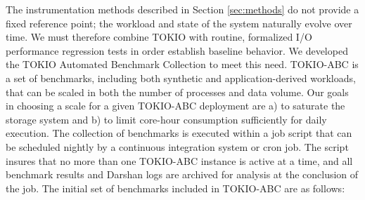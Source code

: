 The instrumentation methods described in Section \ref{sec:methods}
do not provide a fixed reference point; the workload and state of the
system naturally evolve over time.  We must therefore combine TOKIO with
routine, formalized I/O performance regression tests in order establish baseline behavior.
%
We developed the TOKIO Automated Benchmark Collection to meet
this need.
TOKIO-ABC is a set of benchmarks, including
both synthetic and application-derived workloads, that can be scaled in
both the number of processes and data volume.
Our goals in choosing a scale for a given TOKIO-ABC deployment are
a) to saturate the storage system and
b) to limit core-hour consumption sufficiently for daily execution.
The collection of benchmarks is
executed within a job script that can be scheduled nightly by a continuous
integration system or cron job.  The script insures that no more than
one TOKIO-ABC instance is active at a time, and all benchmark results
and Darshan logs are archived for analysis at the conclusion of the job.
The initial set of benchmarks included in TOKIO-ABC are as follows:

